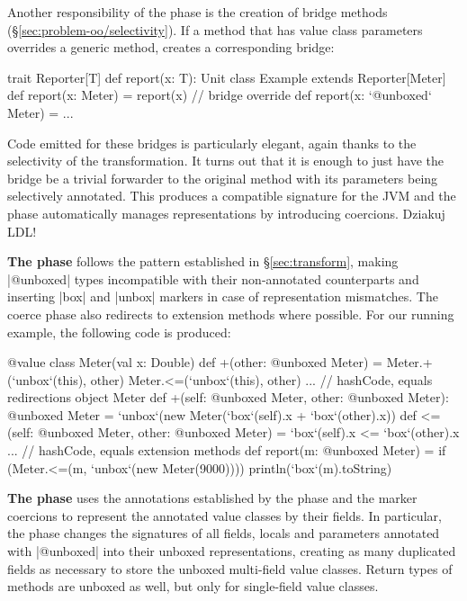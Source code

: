 Another responsibility of the \inject{} phase is the creation of bridge methods (\S\ref{sec:problem-oo/selectivity}). If a method that has value class parameters overrides a generic method, \inject{} creates a corresponding bridge:

\begin{lstlisting-nobreak}
 trait Reporter[T] {
   def report(x: T): Unit
 }
 class Example extends Reporter[Meter] {
   def report(x: Meter) = report(x) // bridge
   override def report(x: `@unboxed` Meter) = ...
 }
\end{lstlisting-nobreak}

Code emitted for these bridges is particularly elegant, again thanks to the selectivity of the transformation. It turns out that it is enough to just have the bridge be a trivial forwarder to the original method with its parameters being selectively annotated. This produces a compatible signature for the JVM and the \coerce{} phase automatically manages representations by introducing coercions. Dziakuj LDL!

\textbf{The \coerce{} phase} follows the pattern established in \S\ref{sec:transform}, making |@unboxed| types incompatible with their non-annotated counterparts and inserting |box| and |unbox| markers in case of representation mismatches. The coerce phase also redirects to extension methods where possible. For our running example, the following code is produced:

\begin{lstlisting-nobreak}
 @value class Meter(val x: Double) {
   def +(other: @unboxed Meter) =
     Meter.+(`unbox`(this), other)
     Meter.<=(`unbox`(this), other)
   ... // hashCode, equals redirections
 }
 object Meter {
   def +(self: @unboxed Meter, other: @unboxed Meter): @unboxed Meter = `unbox`(new Meter(`box`(self).x + `box`(other).x))
   def <=(self: @unboxed Meter, other: @unboxed Meter) = `box`(self).x <= `box`(other).x
   ... // hashCode, equals extension methods
 }
 def report(m: @unboxed Meter) = {
   if (Meter.<=(m, `unbox`(new Meter(9000))))
     println(`box`(m).toString)
 }
\end{lstlisting-nobreak}

\textbf{The \commit{} phase} uses the annotations established by the \inject{} phase and the marker coercions to represent the annotated value classes by their fields. In particular, the \commit{} phase changes the signatures of all fields, locals and parameters annotated with |@unboxed| into their unboxed representations, creating as many duplicated fields as necessary to store the unboxed multi-field value classes. Return types of methods are unboxed as well, but only for single-field value classes.

